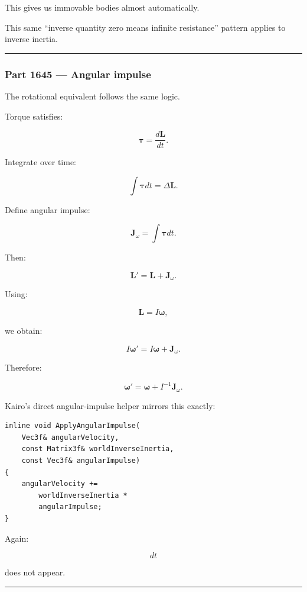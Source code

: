 This gives us immovable bodies almost automatically.

This same ``inverse quantity zero means infinite resistance'' pattern applies to inverse inertia.

\begin{center}\rule{0.5\linewidth}{0.5pt}\end{center}

\subsubsection{Part 1645 --- Angular impulse}\label{part-1645-angular-impulse}

The rotational equivalent follows the same logic.

Torque satisfies:

\[
\boldsymbol\tau
=
\frac{d\mathbf L}{dt}.
\]

Integrate over time:

\[
\int\boldsymbol\tau dt
=
\Delta\mathbf L.
\]

Define angular impulse:

\[
\boxed{
\mathbf J_\omega
=
\int\boldsymbol\tau dt.
}
\]

Then:

\[
\boxed{
\mathbf L'
=
\mathbf L+
\mathbf J_\omega.
}
\]

Using:

\[
\mathbf L=I\boldsymbol\omega,
\]

we obtain:

\[
I\boldsymbol\omega'
=
I\boldsymbol\omega+
\mathbf J_\omega.
\]

Therefore:

\[
\boxed{
\boldsymbol\omega'
=
\boldsymbol\omega+
I^{-1}\mathbf J_\omega.
}
\]

Kairo's direct angular-impulse helper mirrors this exactly:

\begin{verbatim}
inline void ApplyAngularImpulse(
    Vec3f& angularVelocity,
    const Matrix3f& worldInverseInertia,
    const Vec3f& angularImpulse)
{
    angularVelocity +=
        worldInverseInertia *
        angularImpulse;
}
\end{verbatim}

Again:

\[
dt
\]

does not appear.

\begin{center}\rule{0.5\linewidth}{0.5pt}\end{center}

